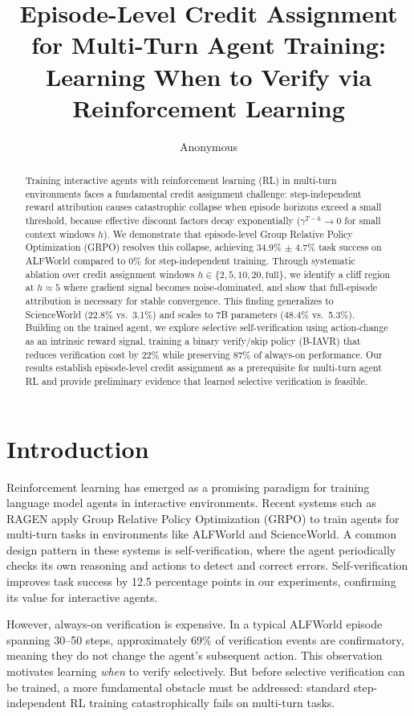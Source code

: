 \documentclass{article}
\title{Episode-Level Credit Assignment for Multi-Turn Agent Training:\\Learning When to Verify via Reinforcement Learning}
\author{Anonymous}
\date{}
\begin{document}
\maketitle

\begin{abstract}
Training interactive agents with reinforcement learning (RL) in multi-turn environments faces a fundamental credit assignment challenge: step-independent reward attribution causes catastrophic collapse when episode horizons exceed a small threshold, because effective discount factors decay exponentially ($\gamma^{T-h} \to 0$ for small context windows $h$). We demonstrate that episode-level Group Relative Policy Optimization (GRPO) resolves this collapse, achieving 34.9\% $\pm$ 4.7\% task success on ALFWorld compared to 0\% for step-independent training. Through systematic ablation over credit assignment windows $h \in \{2, 5, 10, 20, \text{full}\}$, we identify a cliff region at $h \approx 5$ where gradient signal becomes noise-dominated, and show that full-episode attribution is necessary for stable convergence. This finding generalizes to ScienceWorld (22.8\% vs.\ 3.1\%) and scales to 7B parameters (48.4\% vs.\ 5.3\%). Building on the trained agent, we explore selective self-verification using action-change as an intrinsic reward signal, training a binary verify/skip policy (B-IAVR) that reduces verification cost by 22\% while preserving 87\% of always-on performance. Our results establish episode-level credit assignment as a prerequisite for multi-turn agent RL and provide preliminary evidence that learned selective verification is feasible.
\end{abstract}

\section{Introduction}

Reinforcement learning has emerged as a promising paradigm for training language model agents in interactive environments. Recent systems such as RAGEN apply Group Relative Policy Optimization (GRPO) to train agents for multi-turn tasks in environments like ALFWorld and ScienceWorld. A common design pattern in these systems is self-verification, where the agent periodically checks its own reasoning and actions to detect and correct errors. Self-verification improves task success by 12.5 percentage points in our experiments, confirming its value for interactive agents.

However, always-on verification is expensive. In a typical ALFWorld episode spanning 30--50 steps, approximately 69\% of verification events are confirmatory, meaning they do not change the agent's subsequent action. This observation motivates learning \emph{when} to verify selectively. But before selective verification can be trained, a more fundamental obstacle must be addressed: standard step-independent RL training catastrophically fails on multi-turn tasks.
\end{document}
